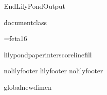 
\def\ifundefined#1{\expandafter\ifx\csname#1\endcsname\relax}


\ifx\mustmakelilypondtitle\undefined\else\makelilypondtitle\fi
\ifx\mustmakelilypondpiecetitle\undefined\else\makelilypondpiecetitle\fi
%
\def\SkipLilydefs{\endinput}
\ifundefined{EndLilyPondOutput}
        \def\EndLilyPondOutput{\csname bye\endcsname}
        \def\SkipLilydefs{}
\fi
\SkipLilydefs

\ifundefined{documentclass}
        
\else
        
\fi



\font\fetasixteen=feta16
\def\fetafont{\fetasixteen}
\def\fetachar#1{\hbox{\fetasixteen#1}}


\def\botalign#1{\vbox to 0pt{\vss #1}}
\def\leftalign#1{\hbox to 0pt{#1\hss}}


%
%

\def\myfilbreak{} %


\ifundefined{lilypondpaperinterscorelinefill}
        \def\lilypondpaperinterscorelinefill{0}
\else
        \def\lilypondpaperinterscorelinefill{1}
\fi

\def\interscoreline{\vskip \lilypondpaperinterscoreline \lilypondpaperunit plus \lilypondpaperinterscorelinefill fill}

\def\placebox#1#2#3{%
        \botalign{\hbox{\raise #1\leftalign{\kern #2{}#3}}}}%

\ifx\pdfoutput\undefined  
  
\else
  \ifx\pdfoutput\relax
    
  \else
    
  \fi
\fi

\def\EndLilyPondOutput{%
 \vskip 0pt plus \lilypondpaperinterscorelinefill00 fill\csname bye\endcsname
}
\def\postheader{}


\ifx\csname nolilyfooter\endcsname\relax
        \csname lilyfooter\texsuffix\endcsname%
\else
        \csname%
        nolilyfooter\texsuffix\endcsname
\fi

\ifx\outputscale\undefined
        \csname global\endcsname\csname newdimen\endcsname\outputscale
\fi
\endinput
